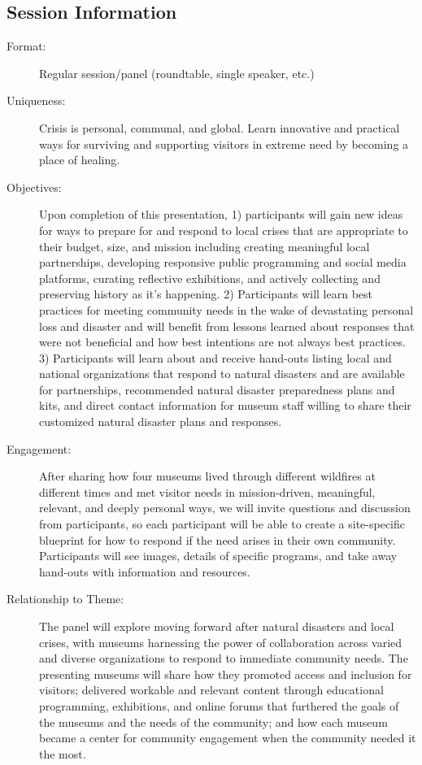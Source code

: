 \documentclass{report}
\begin{document}
              \subsection*{Session Information}
                \begin{description}
                  \item [Format:] Regular session/panel (roundtable, single speaker, etc.)
							    
							    \item [Uniqueness:]Crisis is personal, communal, and global. Learn innovative and practical ways for surviving and supporting visitors in extreme need by becoming a place of healing.
							    \item [Objectives:]Upon completion of this presentation, 1) participants will gain new ideas for ways to prepare for and respond to local crises that are appropriate to their budget, size, and mission including creating meaningful local partnerships, developing responsive public programming and social media platforms, curating reflective exhibitions, and actively collecting and preserving history as it’s happening.
2) Participants will learn best practices for meeting community needs in the wake of devastating personal loss and disaster and will benefit from lessons learned about responses that were not beneficial and how best intentions are not always best practices. 
3) Participants will learn about and receive hand-outs listing local and national organizations that respond to natural disasters and are available for partnerships, recommended natural disaster preparedness plans and kits, and direct contact information for museum staff willing to share their customized natural disaster plans and responses.
							    \item [Engagement:]After sharing how four museums lived through different wildfires at different times and met visitor needs in mission-driven, meaningful, relevant, and deeply personal ways, we will invite questions and discussion from participants, so each participant will be able to create a site-specific blueprint for how to respond if the need arises in their own community. Participants will see images, details of specific programs, and take away hand-outs with information and resources.
							    \item [Relationship to Theme:]The panel will explore moving forward after natural disasters and local crises, with museums harnessing the power of collaboration across varied and diverse organizations to respond to immediate community needs. The presenting museums will share how they promoted access and inclusion for visitors; delivered workable and relevant content through educational programming, exhibitions, and online forums that furthered the goals of the museums and the needs of the community; and how each museum became a center for community engagement when the community needed it the most.
							    
                \end{description}
\end{document}
